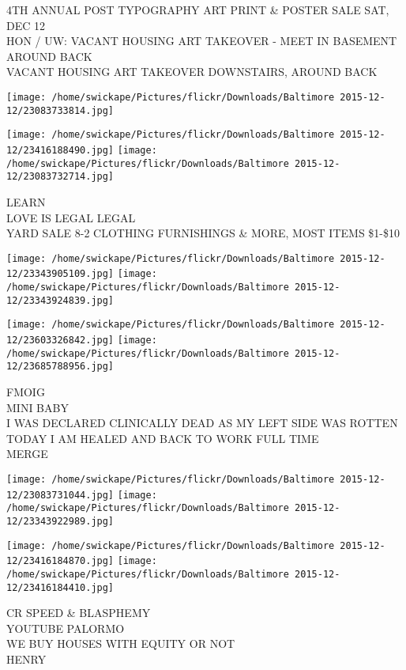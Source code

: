 \documentclass[10pt,letterpaper]{article}
\begin{document}
4TH ANNUAL POST TYPOGRAPHY ART PRINT \& POSTER SALE SAT, DEC 12\\
HON / UW: VACANT HOUSING ART TAKEOVER {-} MEET IN BASEMENT AROUND BACK\\
VACANT HOUSING ART TAKEOVER DOWNSTAIRS, AROUND BACK\\
\pagebreak

\texttt{[image: /home/swickape/Pictures/flickr/Downloads/Baltimore 2015-12-12/23083733814.jpg]}

\vspace{0.25in}
\texttt{[image: /home/swickape/Pictures/flickr/Downloads/Baltimore 2015-12-12/23416188490.jpg]}
\texttt{[image: /home/swickape/Pictures/flickr/Downloads/Baltimore 2015-12-12/23083732714.jpg]}

LEARN\\
LOVE IS LEGAL LEGAL\\
YARD SALE 8{-}2 CLOTHING FURNISHINGS \& MORE, MOST ITEMS \$1{-}\$10\\
\pagebreak

\texttt{[image: /home/swickape/Pictures/flickr/Downloads/Baltimore 2015-12-12/23343905109.jpg]}
\texttt{[image: /home/swickape/Pictures/flickr/Downloads/Baltimore 2015-12-12/23343924839.jpg]}

\texttt{[image: /home/swickape/Pictures/flickr/Downloads/Baltimore 2015-12-12/23603326842.jpg]}
\texttt{[image: /home/swickape/Pictures/flickr/Downloads/Baltimore 2015-12-12/23685788956.jpg]}

FMOIG\\
MINI BABY\\
I WAS DECLARED CLINICALLY DEAD AS MY LEFT SIDE WAS ROTTEN TODAY I AM HEALED AND BACK TO WORK FULL TIME\\
MERGE\\
\pagebreak

\texttt{[image: /home/swickape/Pictures/flickr/Downloads/Baltimore 2015-12-12/23083731044.jpg]}
\texttt{[image: /home/swickape/Pictures/flickr/Downloads/Baltimore 2015-12-12/23343922989.jpg]}

\texttt{[image: /home/swickape/Pictures/flickr/Downloads/Baltimore 2015-12-12/23416184870.jpg]}
\texttt{[image: /home/swickape/Pictures/flickr/Downloads/Baltimore 2015-12-12/23416184410.jpg]}

CR SPEED \& BLASPHEMY\\
YOUTUBE PALORMO\\
WE BUY HOUSES WITH EQUITY OR NOT\\
HENRY\\
\pagebreak
\end{document}
